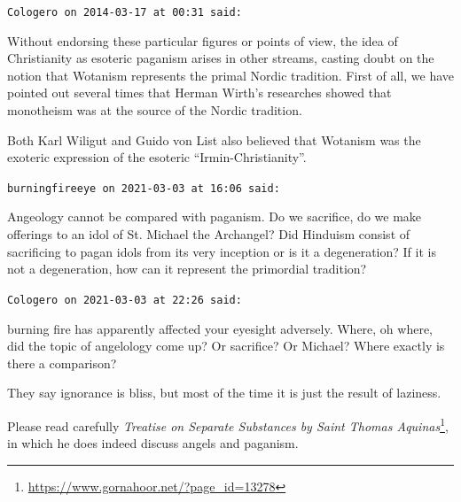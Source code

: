 \begin{footnotesize}
\begin{sffamily}
\hfill

\texttt{Cologero on 2014-03-17 at 00:31 said:}

Without endorsing these particular figures or points of view, the idea of Christianity as esoteric paganism arises in other streams, casting doubt on the notion that Wotanism represents the primal Nordic tradition. First of all, we have pointed out several times that Herman Wirth's researches showed that monotheism was at the source of the Nordic tradition.

Both Karl Wiligut and Guido von List also believed that Wotanism was the exoteric expression of the esoteric ``Irmin-Christianity''.

\hfill

\texttt{burningfireeye on 2021-03-03 at 16:06 said:}

Angeology cannot be compared with paganism. Do we sacrifice, do we make offerings to an idol of St. Michael the Archangel? Did Hinduism consist of sacrificing to pagan idols from its very inception or is it a degeneration? If it is not a degeneration, how can it represent the primordial tradition?

\hfill

\texttt{Cologero on 2021-03-03 at 22:26 said:}

burning fire has apparently affected your eyesight adversely. Where, oh where, did the topic of angelology come up? Or sacrifice? Or Michael? Where exactly is there a comparison?

They say ignorance is bliss, but most of the time it is just the result of laziness. 

Please read carefully \textit{Treatise on Separate Substances by Saint Thomas Aquinas}\footnote{\url{https://www.gornahoor.net/?page_id=13278}}, in which he does indeed discuss angels and paganism.

\end{sffamily}
\end{footnotesize}

